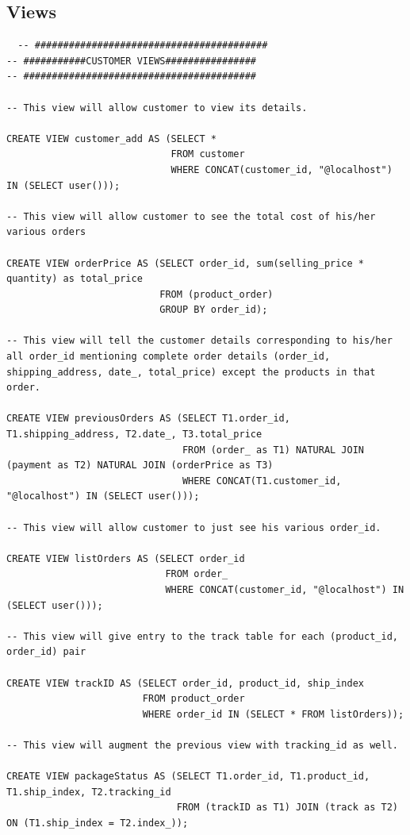 \documentclass[a4paper,12pt]{article}
\begin{document}
\subsection{Views}
\begin{verbatim}
  -- #########################################
-- ###########CUSTOMER VIEWS################
-- #########################################

-- This view will allow customer to view its details.

CREATE VIEW customer_add AS (SELECT * 
                             FROM customer 
                             WHERE CONCAT(customer_id, "@localhost") IN (SELECT user()));

-- This view will allow customer to see the total cost of his/her various orders

CREATE VIEW orderPrice AS (SELECT order_id, sum(selling_price * quantity) as total_price
                           FROM (product_order)
                           GROUP BY order_id); 

-- This view will tell the customer details corresponding to his/her all order_id mentioning complete order details (order_id, shipping_address, date_, total_price) except the products in that order. 

CREATE VIEW previousOrders AS (SELECT T1.order_id, T1.shipping_address, T2.date_, T3.total_price
                               FROM (order_ as T1) NATURAL JOIN (payment as T2) NATURAL JOIN (orderPrice as T3)
                               WHERE CONCAT(T1.customer_id, "@localhost") IN (SELECT user()));

-- This view will allow customer to just see his various order_id. 

CREATE VIEW listOrders AS (SELECT order_id
                            FROM order_ 
                            WHERE CONCAT(customer_id, "@localhost") IN (SELECT user()));

-- This view will give entry to the track table for each (product_id, order_id) pair

CREATE VIEW trackID AS (SELECT order_id, product_id, ship_index
                        FROM product_order
                        WHERE order_id IN (SELECT * FROM listOrders));

-- This view will augment the previous view with tracking_id as well.

CREATE VIEW packageStatus AS (SELECT T1.order_id, T1.product_id, T1.ship_index, T2.tracking_id
                              FROM (trackID as T1) JOIN (track as T2) ON (T1.ship_index = T2.index_));



\end{verbatim}
\end{document}
